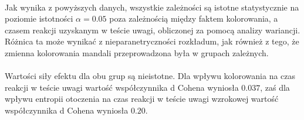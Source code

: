 \documentclass[12pt,a4paper,final,oneside,onecolumn,titlepage]{article}
\begin{document}
\paragraph{}
Jak wynika z powyższych danych, wszystkie zależności są istotne statystycznie na poziomie istotności $\alpha = 0.05$ poza zależnością między faktem kolorowania, a czasem reakcji uzyskanym w teście uwagi, obliczonej za pomocą analizy wariancji. Różnica ta może wynikać z nieparanetryczności rozkładum, jak również z tego, że zmienna kolorowania mandali przeprowadzona była w grupach zależnych.
\paragraph{}
Wartości siły efektu dla obu grup są nieistotne. Dla wpływu kolorowania na czas reakcji w teście uwagi wartość współczynnika d Cohena wyniosła $0.037$, zaś dla wpływu entropii otoczenia na czas reakcji w teście uwagi wzrokowej wartość współczynnika d Cohena wyniosła $0.20$.
\end{document}
